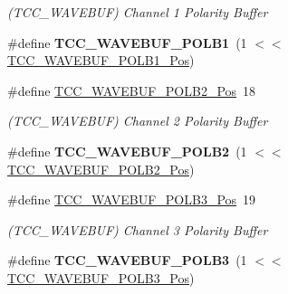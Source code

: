 \begin{DoxyCompactItemize}
\begin{DoxyCompactList}\small\item\em (T\+C\+C\+\_\+\+W\+A\+V\+E\+B\+U\+F) Channel 1 Polarity Buffer \end{DoxyCompactList}\item 
\hypertarget{group___s_a_m_l21___t_c_c_ga28c628b96830cbfbadad51be830f58e7}{}\#define {\bfseries T\+C\+C\+\_\+\+W\+A\+V\+E\+B\+U\+F\+\_\+\+P\+O\+L\+B1}~(1 $<$$<$ \hyperlink{group___s_a_m_l21___t_c_c_ga8918d7edd38d5562f90d3a96c385434d}{T\+C\+C\+\_\+\+W\+A\+V\+E\+B\+U\+F\+\_\+\+P\+O\+L\+B1\+\_\+\+Pos})\label{group___s_a_m_l21___t_c_c_ga28c628b96830cbfbadad51be830f58e7}

\item 
\hypertarget{group___s_a_m_l21___t_c_c_gab0fe3925fbe1a4427d24f9af7cec7269}{}\#define \hyperlink{group___s_a_m_l21___t_c_c_gab0fe3925fbe1a4427d24f9af7cec7269}{T\+C\+C\+\_\+\+W\+A\+V\+E\+B\+U\+F\+\_\+\+P\+O\+L\+B2\+\_\+\+Pos}~18\label{group___s_a_m_l21___t_c_c_gab0fe3925fbe1a4427d24f9af7cec7269}

\begin{DoxyCompactList}\small\item\em (T\+C\+C\+\_\+\+W\+A\+V\+E\+B\+U\+F) Channel 2 Polarity Buffer \end{DoxyCompactList}\item 
\hypertarget{group___s_a_m_l21___t_c_c_ga4cd1bafa1e5cb7e0f2ace9bc0626d02f}{}\#define {\bfseries T\+C\+C\+\_\+\+W\+A\+V\+E\+B\+U\+F\+\_\+\+P\+O\+L\+B2}~(1 $<$$<$ \hyperlink{group___s_a_m_l21___t_c_c_gab0fe3925fbe1a4427d24f9af7cec7269}{T\+C\+C\+\_\+\+W\+A\+V\+E\+B\+U\+F\+\_\+\+P\+O\+L\+B2\+\_\+\+Pos})\label{group___s_a_m_l21___t_c_c_ga4cd1bafa1e5cb7e0f2ace9bc0626d02f}

\item 
\hypertarget{group___s_a_m_l21___t_c_c_gaa2022cf77877668b18ef121c4ab26f6d}{}\#define \hyperlink{group___s_a_m_l21___t_c_c_gaa2022cf77877668b18ef121c4ab26f6d}{T\+C\+C\+\_\+\+W\+A\+V\+E\+B\+U\+F\+\_\+\+P\+O\+L\+B3\+\_\+\+Pos}~19\label{group___s_a_m_l21___t_c_c_gaa2022cf77877668b18ef121c4ab26f6d}

\begin{DoxyCompactList}\small\item\em (T\+C\+C\+\_\+\+W\+A\+V\+E\+B\+U\+F) Channel 3 Polarity Buffer \end{DoxyCompactList}\item 
\hypertarget{group___s_a_m_l21___t_c_c_ga30aad77941585ea9b3090d3ba8b4a87e}{}\#define {\bfseries T\+C\+C\+\_\+\+W\+A\+V\+E\+B\+U\+F\+\_\+\+P\+O\+L\+B3}~(1 $<$$<$ \hyperlink{group___s_a_m_l21___t_c_c_gaa2022cf77877668b18ef121c4ab26f6d}{T\+C\+C\+\_\+\+W\+A\+V\+E\+B\+U\+F\+\_\+\+P\+O\+L\+B3\+\_\+\+Pos})\label{group___s_a_m_l21___t_c_c_ga30aad77941585ea9b3090d3ba8b4a87e}


\end{DoxyCompactItemize}
